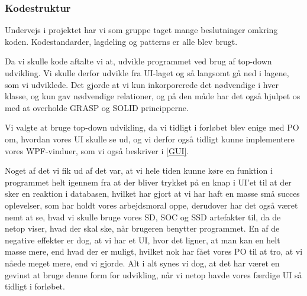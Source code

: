 \subsubsection{Kodestruktur}

Undervejs i projektet har vi som gruppe taget mange beslutninger omkring koden.
Kodestandarder, lagdeling og patterns er alle blev brugt. 

Da vi skulle kode aftalte vi at, udvikle programmet ved brug af top-down udvikling.
Vi skulle derfor udvikle fra UI-laget og så langsomt gå ned i lagene, som vi udviklede.
Det gjorde at vi kun inkorporerede det nødvendige i hver klasse, og kun gav nødvendige relationer, og på den måde har det også hjulpet os med at overholde GRASP og SOLID principperne.

Vi valgte at bruge top-down udvikling, da vi tidligt i forløbet blev enige med PO om, hvordan vores UI skulle se ud, og vi derfor også tidligt kunne implementere vores WPF-vinduer, som vi også beskriver i \ref{GUI}.

Noget af det vi fik ud af det var, at vi hele tiden kunne køre en funktion i programmet helt igennem fra at der bliver trykket på en knap i UI'et til at der sker en reaktion i databasen, hvilket har gjort at vi har haft en masse små succes oplevelser, som har holdt vores arbejdsmoral oppe, derudover har det også været nemt at se, hvad vi skulle bruge vores SD, SOC og SSD artefakter til, da de netop viser, hvad der skal ske, når brugeren benytter programmet.
En af de negative effekter er dog, at vi har et UI, hvor det ligner, at man kan en helt masse mere, end hvad der er muligt, hvilket nok har fået vores PO til at tro, at vi nåede meget mere, end vi gjorde.
Alt i alt synes vi dog, at det har været en gevinst at bruge denne form for udvikling, når vi netop havde vores færdige UI så tidligt i forløbet.